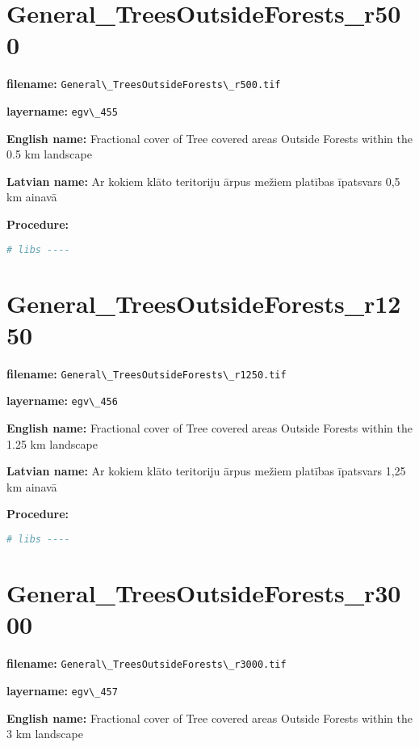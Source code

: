 \documentclass[
]{book}
\newcommand{\passthrough}[1]{#1}
\begin{document}
\section{General\_TreesOutsideForests\_r500}\label{ch06.455}

\textbf{filename:} \passthrough{\lstinline!General\_TreesOutsideForests\_r500.tif!}

\textbf{layername:} \passthrough{\lstinline!egv\_455!}

\textbf{English name:} Fractional cover of Tree covered areas Outside Forests within the 0.5 km landscape

\textbf{Latvian name:} Ar kokiem klāto teritoriju ārpus mežiem platības īpatsvars 0,5 km ainavā

\textbf{Procedure:}

\begin{lstlisting}[language=R]
# libs ----
\end{lstlisting}

\section{General\_TreesOutsideForests\_r1250}\label{ch06.456}

\textbf{filename:} \passthrough{\lstinline!General\_TreesOutsideForests\_r1250.tif!}

\textbf{layername:} \passthrough{\lstinline!egv\_456!}

\textbf{English name:} Fractional cover of Tree covered areas Outside Forests within the 1.25 km landscape

\textbf{Latvian name:} Ar kokiem klāto teritoriju ārpus mežiem platības īpatsvars 1,25 km ainavā

\textbf{Procedure:}

\begin{lstlisting}[language=R]
# libs ----
\end{lstlisting}

\section{General\_TreesOutsideForests\_r3000}\label{ch06.457}

\textbf{filename:} \passthrough{\lstinline!General\_TreesOutsideForests\_r3000.tif!}

\textbf{layername:} \passthrough{\lstinline!egv\_457!}

\textbf{English name:} Fractional cover of Tree covered areas Outside Forests within the 3 km landscape
\end{document}
